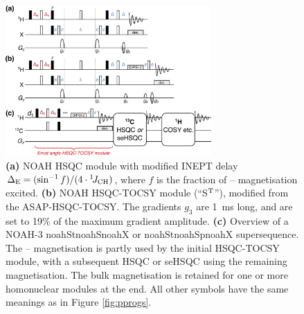 \documentclass[11pt]{article}
\newcommand*{\noahthree}[3]{\csname noah#1\endcsname\csname noah#2\endcsname\csname noah#3\endcsname}
\newcommand*{\noahSt}{S$\rm ^T$}
\newcommand*{\carbon}{\ce{^{13}C}}
\newcommand*{\proton}{\ce{^{1}H}}
\newcommand*{\onejch}{{}^{1}\!J_{\ce{CH}}}
\newcommand*{\figref}[1]{Figure \ref{fig:#1}}
\begin{document}


\begin{figure}
    \centering
    \includegraphics[width=0.7\textwidth]{pprogs_hsqct.png}
    \caption{
        \textbf{(a)} NOAH HSQC module with modified INEPT delay $\Delta_{\mathrm{E}} = (\sin^{-1} f)/(4\cdot\onejch)$, where $f$ is the fraction of \carbon{}--\proton{} magnetisation excited.
        \textbf{(b)} NOAH HSQC-TOCSY module (``\noahSt{}''), modified from the ASAP-HSQC-TOCSY.\autocite{Becker2019JMR}
        The gradients $g_3$ are \SI{1}{\ms} long, and are set to 19\% of the maximum gradient amplitude.
        \textbf{(c)} Overview of a NOAH-3 \noahthree{St}{S}{X} or \noahthree{St}{Sp}{X} supersequence.
        The \carbon{}--\proton{} magnetisation is partly used by the initial HSQC-TOCSY module, with a subsequent HSQC or seHSQC using the remaining magnetisation.
        The bulk magnetisation is retained for one or more homonuclear modules at the end.
        All other symbols have the same meanings as in \figref{pprogs}.
    }
    \label{fig:pprogs_hsqct}
\end{figure}
\end{document}
